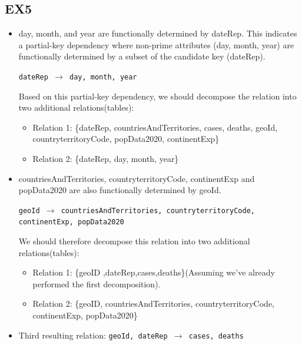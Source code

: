 \documentclass[12pt,oneside,a4paper,english]{article}
\begin{document}
\subsection{EX5}
\begin{itemize}
    \item day, month, and year are functionally determined by dateRep. This indicates a partial-key dependency where non-prime attributes (day, month, year) are functionally determined by a subset of the candidate key (dateRep).

    \texttt{dateRep $\rightarrow$ day, month, year}
    
    Based on this partial-key dependency, we should decompose the relation into two additional relations(tables):
    \begin{itemize}
        \item Relation 1: \{dateRep, countriesAndTerritories, cases, deaths, geoId, countryterritoryCode, popData2020, continentExp\}
        \item Relation 2: \{dateRep, day, month, year\}

    \end{itemize}

    \item countriesAndTerritories, countryterritoryCode, continentExp and popData2020 are also functionally determined by geoId.

    \texttt{geoId $\rightarrow$ countriesAndTerritories, countryterritoryCode, continentExp, popData2020}

    We should therefore decompose this relation into two additional relations(tables):
    \begin{itemize}
        \item Relation 1: \{geoID ,dateRep,cases,deaths\}(Assuming we've already performed the first decomposition).
        \item Relation 2: \{geoID, countriesAndTerritories, countryterritoryCode, continentExp, popData2020\}
    \end{itemize}

    \item Third resulting relation: \texttt{geoId, dateRep $\rightarrow$ cases, deaths}
    

\end{itemize}
\end{document}
